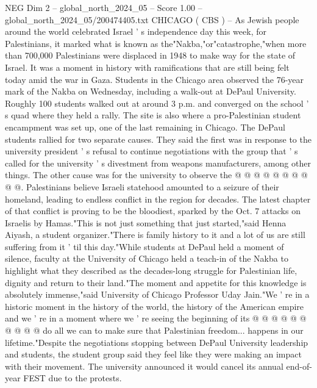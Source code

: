 \begin{textsample}{NEG Dim 2 – global\_north\_2024\_05 – Score 1.00 – global\_north\_2024\_05/200474405.txt}  \label{ex:f2_neg_150}
CHICAGO ( CBS ) -- As Jewish people around the world celebrated Israel ' s independence day this week, for Palestinians, it marked what is known as the"Nakba,"or"catastrophe,"when more than 700,000 Palestinians were displaced in 1948 to make way for the state of Israel.
It was a moment in history with ramifications that are still being felt today amid the war in Gaza.
Students in the Chicago area observed the 76-year mark of the Nakba on Wednesday, including a walk-out at DePaul University.
Roughly 100 students walked out at around 3 p.m. and converged on the school ' s quad where they held a rally.
The site is also where a pro-Palestinian student encampment was set up, one of the last remaining in Chicago.
The DePaul students rallied for two separate causes.
They said the first was in response to the university president ' s refusal to continue negotiations with the group that ' s called for the university ' s divestment from weapons manufacturers, among other things.
The other cause was for the university to observe the @ @ @ @ @ @ @ @ @ @.
Palestinians believe Israeli statehood amounted to a seizure of their homeland, leading to endless conflict in the region for decades.
The latest chapter of that conflict is proving to be the bloodiest, sparked by the Oct. 7 attacks on Israelis by Hamas."This is not just something that just started,"said Henna Aiyash, a student organizer."There is family history to it and a lot of us are still suffering from it ' til this day."While students at DePaul held a moment of silence, faculty at the University of Chicago held a teach-in of the Nakba to highlight what they described as the decades-long struggle for Palestinian life, dignity and return to their land."The moment and appetite for this knowledge is absolutely immense,"said University of Chicago Professor Uday Jain."We ' re in a historic moment in the history of the world, the history of the American empire and we ' re in a moment where we ' re seeing the beginning of its @ @ @ @ @ @ @ @ @ @ do all we can to make sure that Palestinian freedom... happens in our lifetime."Despite the negotiations stopping between DePaul University leadership and students, the student group said they feel like they were making an impact with their movement.
The university announced it would cancel its annual end-of-year FEST due to the protests.

\end{textsample}
